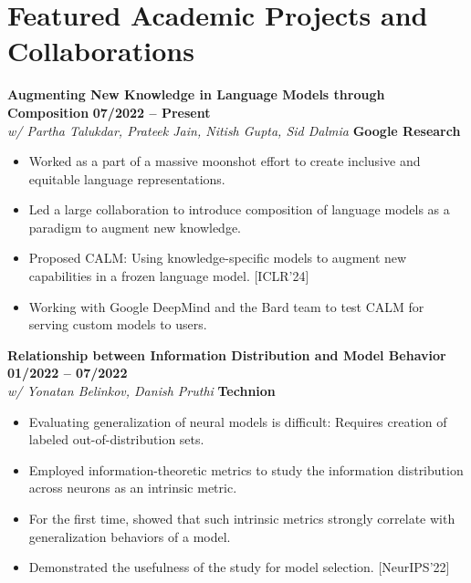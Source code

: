 \documentclass[10pt,letterpaper]{article}
\begin{document}
\section*{Featured Academic Projects and Collaborations}
\textbf{Augmenting New Knowledge in Language Models through Composition} \hfill \textbf{07/2022 -- Present} \\
\textit{w/ Partha Talukdar, Prateek Jain, Nitish Gupta, Sid Dalmia} \hfill \textcolor{accent}{\textbf{Google Research}}
\begin{itemize}
    \item Worked as a part of a massive moonshot effort to create inclusive and equitable language representations.
    \item Led a large collaboration to introduce composition of language models as a paradigm to augment new knowledge.
    \item Proposed CALM: Using knowledge-specific models to augment new capabilities in a frozen language model. [ICLR'24]
    \item Working with Google DeepMind and the Bard team to test CALM for serving custom models to users.
\end{itemize}

\vspace{3pt}

\textbf{Relationship between Information Distribution and Model Behavior} \hfill \textbf{01/2022 -- 07/2022} \\
\textit{w/ Yonatan Belinkov, Danish Pruthi} \hfill \textcolor{accent}{\textbf{Technion}}
\begin{itemize}
    \item Evaluating generalization of neural models is difficult: Requires creation of labeled out-of-distribution sets.
    \item Employed information-theoretic metrics to study the information distribution across neurons as an intrinsic metric.
    \item For the first time, showed that such intrinsic metrics strongly correlate with generalization behaviors of a model.
    \item Demonstrated the usefulness of the study for model selection. [NeurIPS'22]
\end{itemize}

\vspace{3pt}
\end{document}
